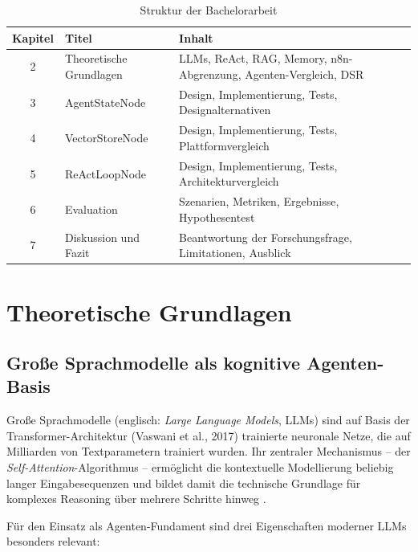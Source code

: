 \documentclass[12pt,a4paper,oneside]{report}
\begin{document}
\begin{table}[H]
  \centering
  \caption{Struktur der Bachelorarbeit}
  \label{tab:aufbau}
  \begin{tabularx}{\textwidth}{clX}
    \toprule
    \textbf{Kapitel} & \textbf{Titel} & \textbf{Inhalt} \\
    \midrule
    2 & Theoretische Grundlagen  & LLMs, ReAct, RAG, Memory, n8n-Abgrenzung,
                                   Agenten-Vergleich, \ac{DSR} \\
    3 & AgentStateNode           & Design, Implementierung, Tests, Designalternativen \\
    4 & VectorStoreNode          & Design, Implementierung, Tests, Plattformvergleich \\
    5 & ReActLoopNode            & Design, Implementierung, Tests, Architekturvergleich \\
    6 & Evaluation               & Szenarien, Metriken, Ergebnisse, Hypothesentest \\
    7 & Diskussion und Fazit     & Beantwortung der Forschungsfrage, Limitationen, Ausblick \\
    \bottomrule
  \end{tabularx}
\end{table}

\chapter{Theoretische Grundlagen}

\section{Große Sprachmodelle als kognitive Agenten-Basis}

Große Sprachmodelle (englisch: \textit{Large Language Models}, \ac{LLM}s) sind
auf Basis der Transformer-Architektur (Vaswani et al., 2017) trainierte neuronale
Netze, die auf Milliarden von Textparametern trainiert wurden. Ihr zentraler
Mechanismus -- der \textit{Self-Attention}-Algorithmus -- ermöglicht die kontextuelle
Modellierung beliebig langer Eingabesequenzen und bildet damit die technische
Grundlage für komplexes Reasoning über mehrere Schritte hinweg \cite{openai2023gpt4}.

Für den Einsatz als Agenten-Fundament sind drei Eigenschaften moderner \ac{LLM}s
besonders relevant:
\end{document}

